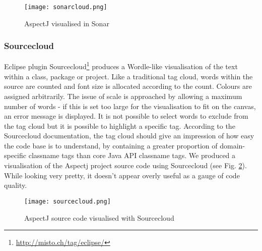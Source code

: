 \begin{figure}[h!]
   \centering
   \texttt{[image: sonarcloud.png]}
  \caption{AspectJ visualised in Sonar}
  \label{fig:aspectjsonar}
\end{figure}

\subsubsection{Sourcecloud}

Eclipse plugin Sourcecloud\footnote{\url{http://misto.ch/tag/eclipse/}} produces a Wordle-like visualisation of the text within a class, package or project. Like a traditional tag cloud, words within the source are counted and font size is allocated according to the count. Colours are assigned arbitrarily. The issue of scale is approached by allowing a maximum number of words - if this is set too large for the visualisation to fit on the canvas, an error message is displayed. It is not possible to select words to exclude from the tag cloud but it is possible to highlight a specific tag. According to the Sourcecloud documentation, the tag cloud should give an impression of how easy the code base is to understand, by containing a greater proportion of domain-specific classname tags than core Java API classname tags. We produced a visualisation of the Aspectj project source code using Sourcecloud (see Fig. \ref{fig:sourcecloud}). While looking very pretty, it doesn't appear overly useful as a gauge of code quality.

\begin{figure}[h!]
   	\centering
  	\texttt{[image: sourcecloud.png]}	
	\caption{AspectJ source code visualised with Sourcecloud}
	\label{fig:sourcecloud}
\end{figure}



